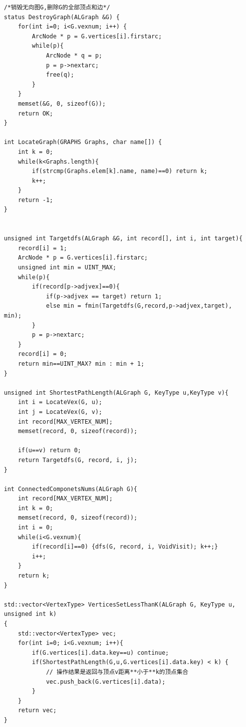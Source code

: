 \documentclass[supercite]{Experimental_Report}
\theoremstyle{definition}
\begin{document}
\begin{lstlisting}
/*销毁无向图G,删除G的全部顶点和边*/
status DestroyGraph(ALGraph &G) {
    for(int i=0; i<G.vexnum; i++) {
        ArcNode * p = G.vertices[i].firstarc;
        while(p){
            ArcNode * q = p;
            p = p->nextarc;
            free(q);
        }
    }
    memset(&G, 0, sizeof(G));
    return OK;
}

int LocateGraph(GRAPHS Graphs, char name[]) {
    int k = 0;
    while(k<Graphs.length){
        if(strcmp(Graphs.elem[k].name, name)==0) return k;
        k++;
    }
    return -1;
}


unsigned int Targetdfs(ALGraph &G, int record[], int i, int target){
    record[i] = 1;
    ArcNode * p = G.vertices[i].firstarc;
    unsigned int min = UINT_MAX;
    while(p){
        if(record[p->adjvex]==0){
            if(p->adjvex == target) return 1;
            else min = fmin(Targetdfs(G,record,p->adjvex,target), min);
        }
        p = p->nextarc;
    }
    record[i] = 0;
    return min==UINT_MAX? min : min + 1;
}

unsigned int ShortestPathLength(ALGraph G, KeyType u,KeyType v){
    int i = LocateVex(G, u);
    int j = LocateVex(G, v);
    int record[MAX_VERTEX_NUM];
    memset(record, 0, sizeof(record));
    
    if(u==v) return 0;
    return Targetdfs(G, record, i, j);
}

int ConnectedComponetsNums(ALGraph G){
    int record[MAX_VERTEX_NUM];
    int k = 0;
    memset(record, 0, sizeof(record));
    int i = 0;
    while(i<G.vexnum){
        if(record[i]==0) {dfs(G, record, i, VoidVisit); k++;}
        i++;
    }
    return k;
}

std::vector<VertexType> VerticesSetLessThanK(ALGraph G, KeyType u, unsigned int k)
{
    std::vector<VertexType> vec;
    for(int i=0; i<G.vexnum; i++){
        if(G.vertices[i].data.key==u) continue;
        if(ShortestPathLength(G,u,G.vertices[i].data.key) < k) {	
			// 操作结果是返回与顶点v距离**小于**k的顶点集合
            vec.push_back(G.vertices[i].data);
        }
    }
    return vec;
}


\end{lstlisting}
\end{document}
